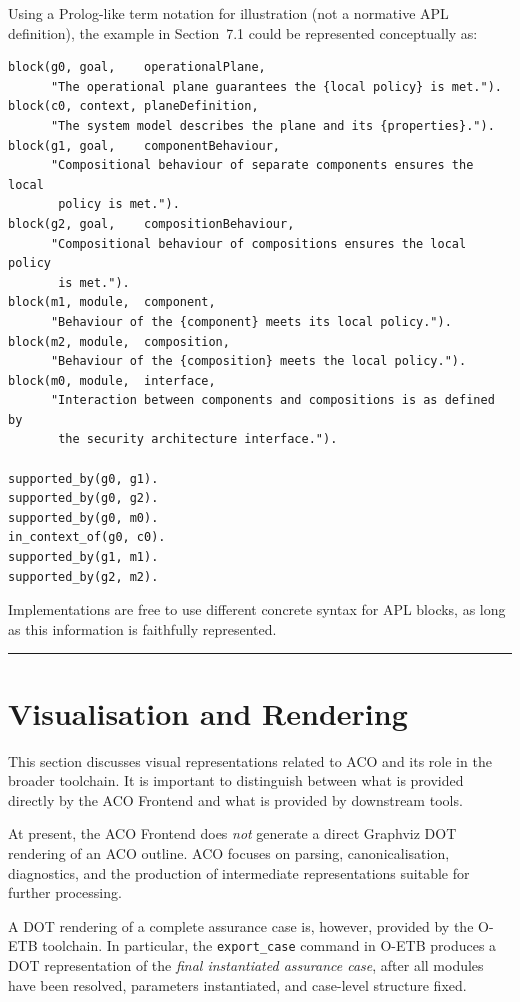 \documentclass[11pt]{article}
\begin{document}
Using a Prolog-like term notation for illustration (not a normative APL definition), the example in Section~7.1 could be represented conceptually as:

\begin{verbatim}
block(g0, goal,    operationalPlane,
      "The operational plane guarantees the {local policy} is met.").
block(c0, context, planeDefinition,
      "The system model describes the plane and its {properties}.").
block(g1, goal,    componentBehaviour,
      "Compositional behaviour of separate components ensures the local
       policy is met.").
block(g2, goal,    compositionBehaviour,
      "Compositional behaviour of compositions ensures the local policy
       is met.").
block(m1, module,  component,
      "Behaviour of the {component} meets its local policy.").
block(m2, module,  composition,
      "Behaviour of the {composition} meets the local policy.").
block(m0, module,  interface,
      "Interaction between components and compositions is as defined by
       the security architecture interface.").

supported_by(g0, g1).
supported_by(g0, g2).
supported_by(g0, m0).
in_context_of(g0, c0).
supported_by(g1, m1).
supported_by(g2, m2).
\end{verbatim}

Implementations are free to use different concrete syntax for APL blocks, as long as this information is faithfully represented.

\bigskip
\hrule
\bigskip

\section{Visualisation and Rendering}

This section discusses visual representations related to ACO and its role in the
broader toolchain. It is important to distinguish between what is provided directly
by the ACO Frontend and what is provided by downstream tools.

At present, the ACO Frontend does \emph{not} generate a direct Graphviz DOT rendering
of an ACO outline. ACO focuses on parsing, canonicalisation, diagnostics, and the
production of intermediate representations suitable for further processing.

A DOT rendering of a complete assurance case is, however, provided by the O-ETB
toolchain. In particular, the \texttt{export\_case} command in O-ETB produces a DOT
representation of the \emph{final instantiated assurance case}, after all modules
have been resolved, parameters instantiated, and case-level structure fixed.
\end{document}
